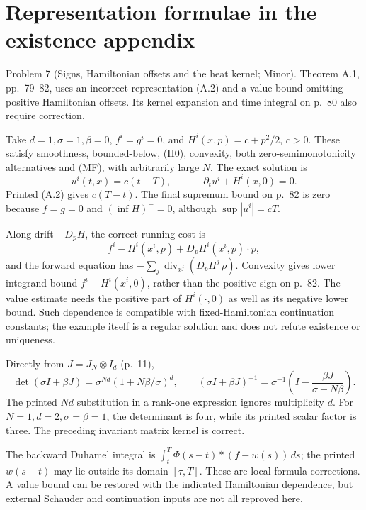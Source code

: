 \documentclass[10pt]{article}
\begin{document}
\section*{Representation formulae in the existence appendix}
Problem 7 (Signs, Hamiltonian offsets and the heat kernel; Minor).  Theorem A.1, pp. 79–82, uses an incorrect representation (A.2) and a value bound omitting positive Hamiltonian offsets. Its kernel expansion and time integral on p. 80 also require correction.\par
Take \(d=1,\sigma=1,\beta=0\), \(f^i=g^i=0\), and \(H^i(x,p)=c+p^2/2\), \(c>0\). These satisfy smoothness, bounded-below, (H0), convexity, both zero-semimonotonicity alternatives and (MF), with arbitrarily large \(N\). The exact solution is \[u^i(t,x)=c(t-T),\qquad -\partial_tu^i+H^i(x,0)=0.\] Printed (A.2) gives \(c(T-t)\). The final supremum bound on p. 82 is zero because \(f=g=0\) and \((\inf H)^-=0\), although \(\sup|u^i|=cT\).\par
Along drift \(-D_pH\), the correct running cost is \[f^i-H^i(x^i,p)+D_pH^i(x^i,p)\cdot p,\] and the forward equation has \(-\sum_j\operatorname{div}_{x^j}(D_pH^j\,\rho)\). Convexity gives lower integrand bound \(f^i-H^i(x^i,0)\), rather than the positive sign on p. 82. The value estimate needs the positive part of \(H^i(\cdot,0)\) as well as its negative lower bound. Such dependence is compatible with fixed-Hamiltonian continuation constants; the example itself is a regular solution and does not refute existence or uniqueness.\par
Directly from \(J=J_N\otimes I_d\) (p. 11), \[\det(\sigma I+\beta J)=\sigma^{Nd}(1+N\beta/\sigma)^d,\qquad
(\sigma I+\beta J)^{-1}
=\sigma^{-1}\left(I-\frac{\beta J}{\sigma+N\beta}\right).\] The printed \(Nd\) substitution in a rank-one expression ignores multiplicity \(d\). For \(N=1,d=2,\sigma=\beta=1\), the determinant is four, while its printed scalar factor is three. The preceding invariant matrix kernel is correct.\par
The backward Duhamel integral is \(\int_t^T\Phi(s-t)*(f-w(s))\,ds\); the printed \(w(s-t)\) may lie outside its domain \([\tau,T]\). These are local formula corrections. A value bound can be restored with the indicated Hamiltonian dependence, but external Schauder and continuation inputs are not all reproved here.\par
\end{document}
